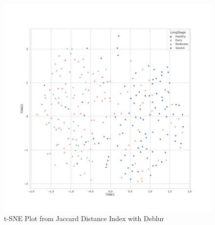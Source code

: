 \documentclass[a4paper]{article}
\begin{document}
            \begin{figure}[p]
                \centering
                \includegraphics[width=0.6 \linewidth]{figures/BetaDiversity/Deblur.jaccard.png}
                \caption{t-SNE Plot from Jaccard Distance Index with Deblur}
                \label{fig:tsne-jaccard-deblur}
            \end{figure}
\end{document}

